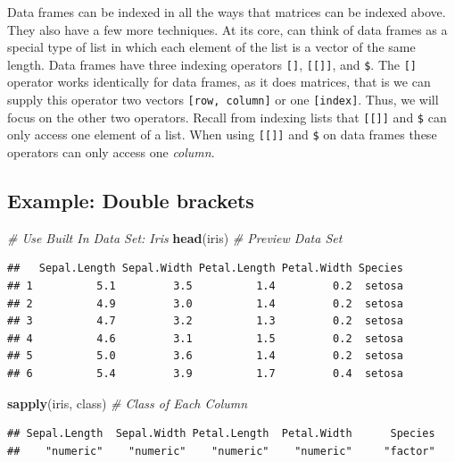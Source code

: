 \documentclass[
]{book}
\newenvironment{Shaded}{\begin{snugshade}}{\end{snugshade}}
\newcommand{\CommentTok}[1]{\textcolor[rgb]{0.56,0.35,0.01}{\textit{#1}}}
\newcommand{\KeywordTok}[1]{\textcolor[rgb]{0.13,0.29,0.53}{\textbf{#1}}}
\newcommand{\NormalTok}[1]{#1}
\begin{document}
Data frames can be indexed in all the ways that matrices can be indexed above. They also have a few more techniques. At its core, can think of data frames as a special type of list in which each element of the list is a vector of the same length. Data frames have three indexing operators \texttt{{[}{]}}, \texttt{{[}{[}{]}{]}}, and \texttt{\$}. The \texttt{{[}{]}} operator works identically for data frames, as it does matrices, that is we can supply this operator two vectors \texttt{{[}row,\ column{]}} or one \texttt{{[}index{]}}. Thus, we will focus on the other two operators. Recall from indexing lists that \texttt{{[}{[}{]}{]}} and \texttt{\$} can only access one element of a list. When using \texttt{{[}{[}{]}{]}} and \texttt{\$} on data frames these operators can only access one \emph{column}.

\hypertarget{example-double-brackets}{%
\subsection*{Example: Double brackets}\label{example-double-brackets}}

\begin{Shaded}
\begin{Highlighting}[]
\CommentTok{# Use Built In Data Set: Iris}
\KeywordTok{head}\NormalTok{(iris)  }\CommentTok{# Preview Data Set}
\end{Highlighting}
\end{Shaded}

\begin{verbatim}
##   Sepal.Length Sepal.Width Petal.Length Petal.Width Species
## 1          5.1         3.5          1.4         0.2  setosa
## 2          4.9         3.0          1.4         0.2  setosa
## 3          4.7         3.2          1.3         0.2  setosa
## 4          4.6         3.1          1.5         0.2  setosa
## 5          5.0         3.6          1.4         0.2  setosa
## 6          5.4         3.9          1.7         0.4  setosa
\end{verbatim}

\begin{Shaded}
\begin{Highlighting}[]
\KeywordTok{sapply}\NormalTok{(iris, class)  }\CommentTok{# Class of Each Column }
\end{Highlighting}
\end{Shaded}

\begin{verbatim}
## Sepal.Length  Sepal.Width Petal.Length  Petal.Width      Species 
##    "numeric"    "numeric"    "numeric"    "numeric"     "factor"
\end{verbatim}
\end{document}
